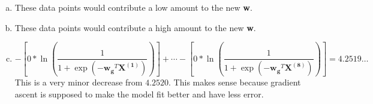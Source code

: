 \documentclass[12pt]{article}
\begin{document}
\begin{enumerate}[(a)]
	\item These data points would contribute a low amount to the new \textbf{w}.
	
	\item These data points would contribute a high amount to the new \textbf{w}.
	
	\item \[-\left[0*\ln{(\dfrac{1}{1+\exp{(-\mathbf{w_g}^T\mathbf{X^{(1)}})}})}\right] + \cdots - \left[0*\ln{(\dfrac{1}{1+\exp{(-\mathbf{w_g}^T\mathbf{X^{(8)}})}})}\right] = 4.2519\ldots\]
	This is a very minor decrease from $ 4.2520 $. This makes sense because gradient ascent is supposed to make the model fit better and have less error.
\end{enumerate}
\newpage

\section{}
\end{document}
